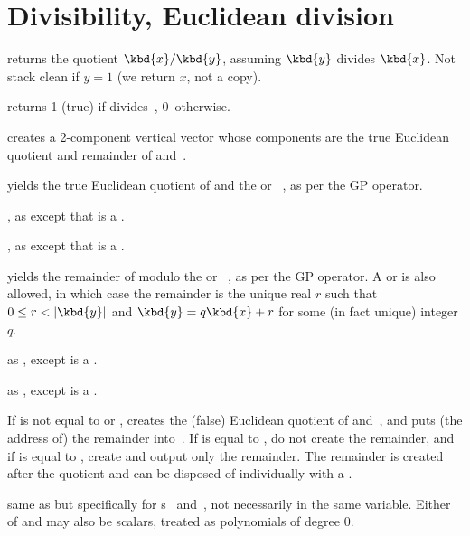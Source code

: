 \section{Divisibility, Euclidean division}

 returns the quotient $\kbd{x} / \kbd{y}$,
assuming $\kbd{y}$ divides $\kbd{x}$. Not stack clean if $y = 1$
(we return $x$, not a copy).

  returns 1 (true) if  divides~,
0~otherwise.

 creates a 2-component vertical
vector whose components are the true Euclidean quotient and remainder
of  and~.

 yields the true Euclidean
quotient of  and the  or ~, as per
the \kbd{\bs} GP operator.

, as 
except that  is a .

, as 
except that  is a .

 yields the remainder of 
modulo the  or ~, as per the \kbd{\%} GP operator.
A  or   is also allowed, in which case the
remainder is the unique real $r$ such that $0 \leq r < |\kbd{y}|$ and
$\kbd{y} = q\kbd{x} + r$ for some (in fact unique) integer $q$.

 as , except  is
a .

 as , except  is
a .

 If  is not equal to
 or , creates the (false) Euclidean quotient of
 and~, and puts (the address of) the remainder into~.
If  is equal to , do not create the remainder, and if
 is equal to , create and output only the remainder.
The remainder is created after the quotient and can be disposed of
individually with a .

 same as  but
specifically for s~ and~, not necessarily in the same
variable. Either of  and  may also be scalars, treated as
polynomials of degree $0$.

